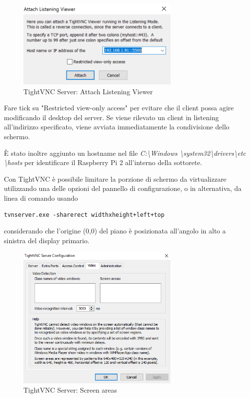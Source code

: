 \begin{figure}[h] %
\includegraphics[width=8cm]{../img/tightvncserver3}
\centering
\caption{TightVNC Server: Attach Listening Viewer}
\end{figure}

Fare tick su "Restricted view-only access" per evitare che il client possa agire modificando il desktop del server.
Se viene rilevato un client in listening all'indirizzo specificato, viene avviata immediatamente la condivisione dello schermo.

È stato inoltre aggiunto un hostname nel file \textit{C:\textbackslash Windows \textbackslash system32\textbackslash drivers\textbackslash etc \textbackslash hosts} per identificare il Raspberry Pi 2 all'interno della sottorete.\newpage

Con TightVNC è possibile limitare la porzione di schermo da virtualizzare utilizzando una delle opzioni del pannello di configurazione, o in alternativa, da linea di comando usando
\begin{lstlisting}
tvnserver.exe -sharerect widthxheight+left+top
\end{lstlisting}
considerando che l'origine (0,0) del piano è posizionata all'angolo in alto a sinistra del display primario.

\begin{figure}[h]
\includegraphics[width=8cm]{../img/tightvncserver4}
\centering
\caption{TightVNC Server: Screen areas}
\end{figure}

